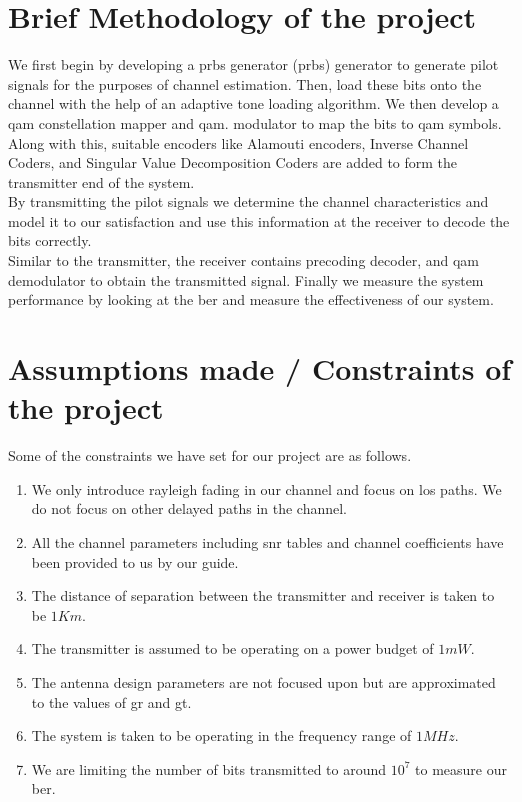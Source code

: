 \section{Brief Methodology of the project}
We first begin by developing a \acrlong{prbs} generator (\acrshort{prbs}) generator to generate \glspl{pilot signal} for the purposes of channel estimation. Then, load these bits onto the channel with the help of an adaptive tone loading algorithm. We then develop a \acrshort{qam} constellation mapper and \acrshort{qam}. modulator to map the bits to \acrshort{qam} symbols. Along with this, suitable encoders like Alamouti encoders, Inverse Channel Coders, and Singular Value Decomposition Coders are added to form the transmitter end of the system.\\
By transmitting the \glspl{pilot signal} we determine the channel characteristics and model it to our satisfaction and use this information at the receiver to decode the bits correctly.\\
Similar to the transmitter, the receiver contains precoding decoder, and \acrshort{qam} demodulator to obtain the transmitted signal. Finally we measure the system performance by looking at the \acrshort{ber} and measure the effectiveness of our system.

\section{Assumptions made / Constraints of the project}
Some of the constraints we have set for our project are as follows.
\begin{enumerate}
\item We only introduce \gls{rayleigh fading} in our channel and focus on \acrshort{los} paths. We do not focus on other delayed paths in the channel.
\item All the channel parameters including \acrshort{snr} tables and channel coefficients have been provided to us by our guide.
\item The distance of separation between the transmitter and receiver is taken to be $1Km$.
\item The transmitter is assumed to be operating on a power budget of $1mW$.
\item The antenna design parameters are not focused upon but are approximated to the values of \acrshort{gr} and \acrshort{gt}.
\item The system is taken to be operating in the frequency range of $1 MHz$.
\item We are limiting the number of bits transmitted to around $10^7$ to measure our \acrshort{ber}.
\end{enumerate}

